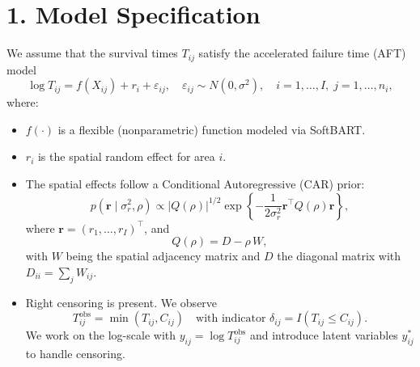 \documentclass[useAMS,referee]{biom}
\begin{document}
\maketitle


%

\section*{1. Model Specification}

We assume that the survival times $T_{ij}$ satisfy the accelerated failure time (AFT) model
\[
\log T_{ij} = f(X_{ij}) + r_i + \varepsilon_{ij}, \quad \varepsilon_{ij} \sim N(0,\sigma^2), \quad i=1,\ldots,I,\; j=1,\ldots,n_i,
\]
where:
\begin{itemize}
  \item $f(\cdot)$ is a flexible (nonparametric) function modeled via SoftBART.
  \item $r_i$ is the spatial random effect for area $i$. 
  \item The spatial effects follow a Conditional Autoregressive (CAR) prior:
    \[
    p(\bm{r}\mid\sigma_r^2,\rho) \propto \vert Q(\rho) \vert^{1/2} \exp\left\{-\frac{1}{2\sigma_r^2}\bm{r}^\top Q(\rho)\bm{r}\right\},
    \]
    where $\bm{r}=(r_1,\ldots,r_I)^\top$, and
    \[
    Q(\rho) = D - \rho\, W,
    \]
    with $W$ being the spatial adjacency matrix and $D$ the diagonal matrix with $D_{ii}=\sum_j W_{ij}$.
  \item Right censoring is present. We observe
    \[
    T_{ij}^{\text{obs}} = \min(T_{ij},C_{ij})\quad \text{with indicator } \delta_{ij}=I(T_{ij}\le C_{ij}).
    \]
    We work on the log-scale with $y_{ij} = \log T_{ij}^{\text{obs}}$ and introduce latent variables $y_{ij}^\ast$ to handle censoring.
\end{itemize}
\end{document}
